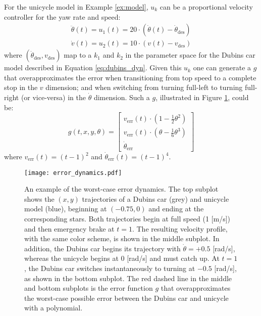 \begin{ex}
For the unicycle model in Example \ref{ex:model}, $u_k$ can be a proportional velocity controller for the yaw rate and speed:
\begin{align}
\ddot{\theta}(t) = u_1(t) = 20\cdot(\dot{\theta}(t) - \dot{\theta}_\text{des}) \\
\dot{v}(t) = u_2(t) = 10\cdot(v(t) - v_\text{des})
\end{align}
where $(\dot{\theta}_\text{des}, v_\text{des})$ map to a $k_1$ and $k_2$ in the parameter space for the Dubins car model described in Equation \eqref{eq:dubins_dyn}.
Given this $u_k$ one can generate a $g$ that overapproximates the error when transitioning from top speed to a complete stop in the $v$ dimension; and when switching from turning full-left to turning full-right (or vice-versa) in the $\dot{\theta}$ dimension. 
Such a $g$, illustrated in Figure \ref{fig:error_dynamics}, could be:
\begin{equation}
\label{eq:g_definition}
g(t,x,y,\theta) = \begin{bmatrix}
v_\text{err}(t)\cdot(1 - \frac{1}{2}\theta^2)  \\
v_\text{err}(t)\cdot(\theta - \frac{1}{6}\theta^3) \\
\dot{\theta}_\text{err}
\end{bmatrix}
\end{equation}
where $v_\text{err}(t) = (t-1)^2$ and $\dot{\theta}_\text{err}(t) = (t-1)^4$.
\end{ex}

\begin{figure}
\centering
\texttt{[image: error\_dynamics.pdf]}
\caption{An example of the worst-case error dynamics. 
The top subplot shows the $(x,y)$ trajectories of a Dubins car (grey) and unicycle model (blue), beginning at $(-0.75,0)$ and ending at the corresponding stars. Both trajectories begin at full speed (1 [m/s]) and then emergency brake at $t = 1$. The resulting velocity profile, with the same color scheme, is shown in the middle subplot. In addition, the Dubins car begins its trajectory with $\dot{\theta} = +0.5$ [rad/s], whereas the unicycle begins at $0$ [rad/s] and must catch up. At $t = 1$, the Dubins car switches instantaneously to turning at $-0.5$ [rad/s], as shown in the bottom subplot. The red dashed line in the middle and bottom subplots is the error function $g$ that overapproximates the worst-case possible error between the Dubins car and unicycle with a polynomial.}
\label{fig:error_dynamics}
\end{figure}

